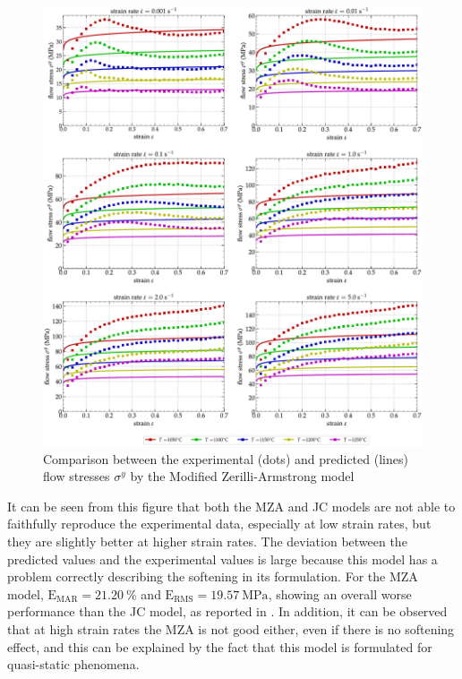 \documentclass[metals,article,submit,pdftex,moreauthors]{Definitions/mdpi}
\DeclareRobustCommand{\RMSE}{\text{E}_\text{RMS}}
\DeclareRobustCommand{\MARE}{\text{E}_\text{MAR}}
\DeclareRobustCommand{\MPa}{\text{MPa}}
\begin{document}
\begin{figure}[!ht]
\centering
\includegraphics[width=\columnwidth]
{Figures/CompExp-MZA-6}
\caption{Comparison between the experimental (dots) and predicted (lines) flow stresses $\sigma^y$ by the Modified Zerilli-Armstrong model}
\label{fig:CompExp-MZA-6}
\end{figure}
It can be seen from this figure that both the MZA and JC models are not able to faithfully reproduce the experimental data, especially at low strain rates, but they are slightly better at higher strain rates.
The deviation between the predicted values and the experimental values is large because this model has a problem correctly describing the softening in its formulation.
For the MZA model, $\MARE=21.20~\%$ and $\RMSE=19.57~\MPa$, showing an overall worse performance than the JC model, as reported in \cite{TizeMha-2022}.
In addition, it can be observed that at high strain rates the MZA is not good either, even if there is no softening effect, and this can be explained by the fact that this model is formulated for quasi-static phenomena.

\end{document}
